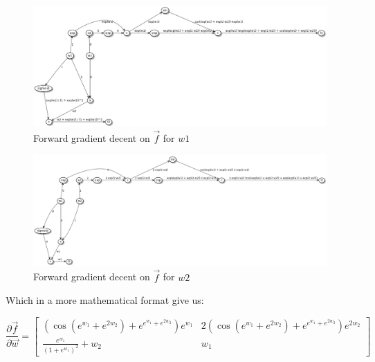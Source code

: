 

\begin{figure}
    \begin{center}
        \includegraphics[width=.95\textwidth]{../2_automatocDifferentiation/computation_graph_forward_w1.png}
        \caption{Forward gradient decent on $\vec{f}$ for $w1$}
    \end{center}
\end{figure}

\begin{figure}
    \begin{center}
        \includegraphics[width=.95\textwidth]{../2_automatocDifferentiation/computation_graph_forward_w2.png}
        \caption{Forward gradient decent on $\vec{f}$ for $w2$}
    \end{center}
\end{figure}

Which in a more mathematical format give us:

\[
    \frac{\partial \vec{f}}{\partial \vec{w}} =
    \begin{bmatrix}
        ( \cos(e^{w_1} + e^{2 w_2}) + e^{e^{w_1} + e^{2 w_2}} ) e^{w_1}   &   2 ( \cos(e^{w_1} + e^{2 w_2}) + e^{e^{w_1} + e^{2 w_2}} ) e^{2 w_2} \\
        \frac{e^{w_1}}{(1 + e^{w_1})^2} + w_2                             &   w_1
    \end{bmatrix}
\]

